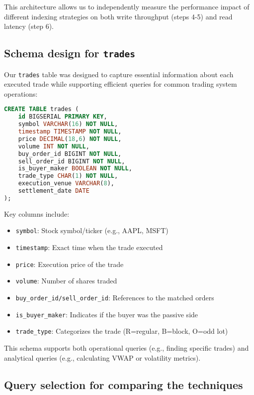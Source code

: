 \documentclass[11pt,a4paper]{article}
\begin{document}
This architecture allows us to independently measure the performance impact of different indexing strategies on both write throughput (steps 4-5) and read latency (step 6).

\subsection{Schema design for \texttt{trades}}

Our \texttt{trades} table was designed to capture essential information about each executed trade while supporting efficient queries for common trading system operations:

\begin{lstlisting}[language=SQL]
CREATE TABLE trades (
    id BIGSERIAL PRIMARY KEY,
    symbol VARCHAR(16) NOT NULL,
    timestamp TIMESTAMP NOT NULL,
    price DECIMAL(18,6) NOT NULL,
    volume INT NOT NULL,
    buy_order_id BIGINT NOT NULL,
    sell_order_id BIGINT NOT NULL,
    is_buyer_maker BOOLEAN NOT NULL,
    trade_type CHAR(1) NOT NULL,
    execution_venue VARCHAR(8),
    settlement_date DATE
);
\end{lstlisting}

Key columns include:
\begin{itemize}
    \item \texttt{symbol}: Stock symbol/ticker (e.g., AAPL, MSFT)
    \item \texttt{timestamp}: Exact time when the trade executed
    \item \texttt{price}: Execution price of the trade
    \item \texttt{volume}: Number of shares traded
    \item \texttt{buy\_order\_id/sell\_order\_id}: References to the matched orders
    \item \texttt{is\_buyer\_maker}: Indicates if the buyer was the passive side
    \item \texttt{trade\_type}: Categorizes the trade (R=regular, B=block, O=odd lot)
\end{itemize}

This schema supports both operational queries (e.g., finding specific trades) and analytical queries (e.g., calculating VWAP or volatility metrics).

\subsection{Query selection for comparing the techniques}
\end{document}
